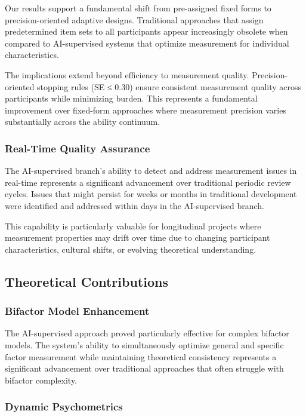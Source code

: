 \documentclass[12pt,a4paper]{article}
\begin{document}
Our results support a fundamental shift from pre-assigned fixed forms to precision-oriented adaptive designs. Traditional approaches that assign predetermined item sets to all participants appear increasingly obsolete when compared to AI-supervised systems that optimize measurement for individual characteristics.

The implications extend beyond efficiency to measurement quality. Precision-oriented stopping rules (SE ≤ 0.30) ensure consistent measurement quality across participants while minimizing burden. This represents a fundamental improvement over fixed-form approaches where measurement precision varies substantially across the ability continuum.

\subsubsection{Real-Time Quality Assurance}

The AI-supervised branch's ability to detect and address measurement issues in real-time represents a significant advancement over traditional periodic review cycles. Issues that might persist for weeks or months in traditional development were identified and addressed within days in the AI-supervised branch.

This capability is particularly valuable for longitudinal projects where measurement properties may drift over time due to changing participant characteristics, cultural shifts, or evolving theoretical understanding.

\subsection{Theoretical Contributions}

\subsubsection{Bifactor Model Enhancement}

The AI-supervised approach proved particularly effective for complex bifactor models. The system's ability to simultaneously optimize general and specific factor measurement while maintaining theoretical consistency represents a significant advancement over traditional approaches that often struggle with bifactor complexity.

\subsubsection{Dynamic Psychometrics}
\end{document}
